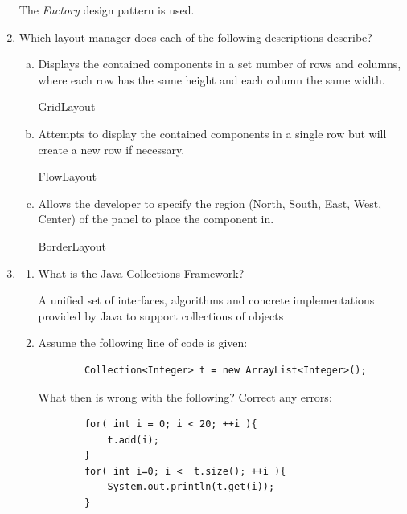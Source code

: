 \documentclass[11pt]{article}
\newenvironment{answer}{\large\lstset{basicstyle=\tiny\ttfamily}\color{white}}{}
\newenvironment{answer}{\large\lstset{basicstyle=\large\ttfamily}\color{red}}{}
\begin{document}
\begin{enumerate}
\begin{answer}
The \emph{Factory} design pattern is used.
\vspace{.5in}
\end{answer}
\pagebreak
\item Which layout manager does each of the following descriptions describe?
\begin{enumerate}[(a)]

\item Displays the contained components in a set number of rows and columns,
      where each row has the same height and each column the same width.

\begin{answer}
GridLayout
\vspace{.5in}
\end{answer}

\item Attempts to display the contained components in a single row but will
      create a new row if necessary.

\begin{answer}
FlowLayout
\vspace{.5in}
\end{answer}

\item Allows the developer to specify the region (North, South, East, West,
      Center) of the panel to place the component in.

\begin{answer}
BorderLayout
\vspace{.5in}
\end{answer}

\end{enumerate}

\item 
    \begin{enumerate} 
    \item What is the Java Collections Framework?

    \begin{answer}
        A unified set of interfaces, algorithms and concrete implementations
    provided by Java to support collections of objects
    \end{answer}

    \item Assume the following line of code is given:
    \begin{lstlisting}
        Collection<Integer> t = new ArrayList<Integer>();
    \end{lstlisting}
    What then is wrong with the following? Correct any errors:
    \begin{lstlisting}
        for( int i = 0; i < 20; ++i ){
            t.add(i);
        }
        for( int i=0; i <  t.size(); ++i ){
            System.out.println(t.get(i));
        }
    \end{lstlisting}


\end{enumerate}
\end{enumerate}
\end{document}
